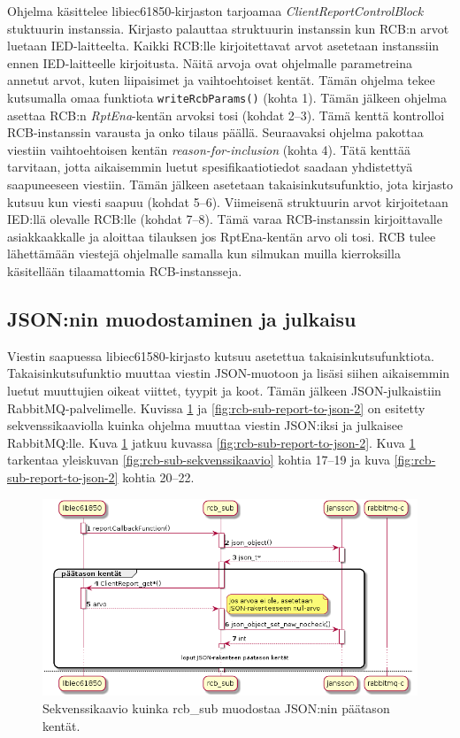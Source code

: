 Ohjelma käsittelee libiec61850-kirjaston tarjoamaa \emph{ClientReportControlBlock} stuktuurin instanssia. Kirjasto palauttaa struktuurin instanssin kun RCB:n arvot luetaan IED-laitteelta. Kaikki RCB:lle kirjoitettavat arvot asetetaan instanssiin ennen IED-laitteelle kirjoitusta. Näitä arvoja ovat ohjelmalle parametreina annetut arvot, kuten liipaisimet ja vaihtoehtoiset kentät. Tämän ohjelma tekee kutsumalla omaa funktiota \texttt{wri\-teRcb\-Pa\-rams\-()} (kohta 1). Tämän jälkeen ohjelma asettaa RCB:n \emph{RptEna}-kentän arvoksi tosi (kohdat 2--3). Tämä kenttä kontrolloi RCB-instanssin varausta ja onko tilaus päällä. Seuraavaksi ohjelma pakottaa viestiin vaihtoehtoisen kentän \emph{reason-for-inclusion} (kohta 4). Tätä kenttää tarvitaan, jotta aikaisemmin luetut spesifikaatiotiedot saadaan yhdistettyä saapuneeseen viestiin. Tämän jälkeen asetetaan takaisinkutsufunktio, jota kirjasto kutsuu kun viesti saapuu (kohdat 5--6). Viimeisenä struktuurin arvot kirjoitetaan IED:llä olevalle RCB:lle (kohdat 7--8). Tämä varaa RCB-instanssin kirjoittavalle asiakkaakkalle ja aloittaa tilauksen jos RptEna-kentän arvo oli tosi. RCB tulee lähettämään viestejä ohjelmalle samalla kun silmukan muilla kierroksilla käsitellään tilaamattomia RCB-instansseja.


\subsection{JSON:nin muodostaminen ja julkaisu}
Viestin saapuessa libiec61580-kirjasto kutsuu asetettua takaisinkutsufunktiota. Takaisinkutsufunktio muuttaa viestin JSON-muotoon ja lisäsi siihen aikaisemmin luetut muuttujien oikeat viittet, tyypit ja koot. Tämän jälkeen JSON-julkaistiin RabbitMQ-palvelimelle. Kuvissa \ref{fig:rcb-sub-report-to-json-1} ja \ref{fig:rcb-sub-report-to-json-2} on esitetty sekvenssikaaviolla kuinka ohjelma muuttaa viestin JSON:iksi ja julkaisee RabbitMQ:lle. Kuva \ref{fig:rcb-sub-report-to-json-1} jatkuu kuvassa \ref{fig:rcb-sub-report-to-json-2}. Kuva \ref{fig:rcb-sub-report-to-json-1} tarkentaa yleiskuvan \ref{fig:rcb-sub-sekvenssikaavio} kohtia 17--19 ja kuva \ref{fig:rcb-sub-report-to-json-2} kohtia 20--22.

\begin{figure}[ht!]
	\includegraphics[width=1\textwidth]{pictures/rcb-sub-report-to-json.png}
	\caption{Sekvenssikaavio kuinka rcb\_sub muodostaa JSON:nin päätason kentät.}
	\label{fig:rcb-sub-report-to-json-1}
\end{figure}

